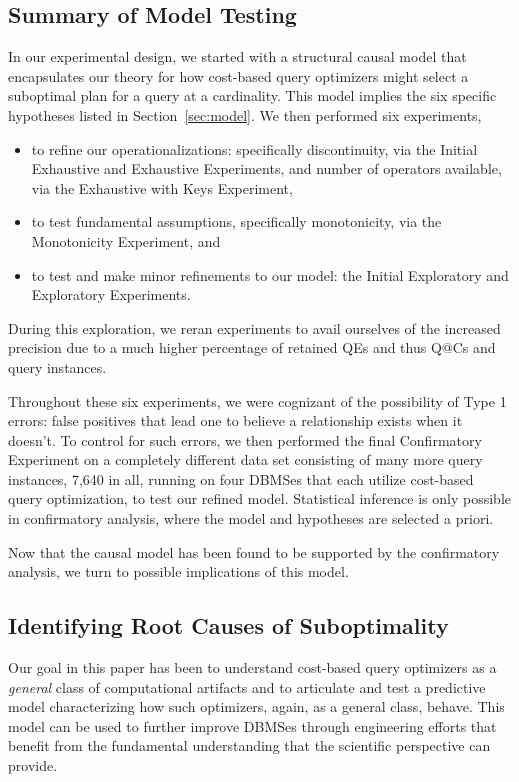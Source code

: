 \documentclass[prodmode,acmtods]{acmsmall}
\begin{document}
\subsection{Summary of Model Testing}
In our experimental design, we started with a structural causal model that
encapsulates our theory for how cost-based query optimizers might select a
suboptimal plan for a query at a cardinality. This model implies the six
specific hypotheses listed in Section~\ref{sec:model}. We then performed
six experiments,
\begin{itemize}
\item to refine our operationalizations: specifically discontinuity,
via the Initial \hbox{Exhaustive} and Exhaustive \hbox{Experiments}, and number of operators available, via the
Exhaustive with Keys \hbox{Experiment},
\item to test fundamental assumptions, specifically
monotonicity, via the Monotonicity \hbox{Experiment}, and
\item to test and make minor
refinements to our model: the Initial Exploratory and \hbox{Exploratory}
Experiments.
\end{itemize}
During this exploration,  we reran
\hbox{experiments} to avail ourselves of the increased precision due to a much
higher percentage of retained QEs and thus Q@Cs and query instances.

Throughout these six experiments, we were cognizant of the
possibility of Type 1 errors: false positives that lead one to believe a
relationship exists when it doesn't.
To control for such errors, we then performed the final Confirmatory 
Experiment on a completely different data set consisting of many more 
query instances, 7,640 in all, running on four \hbox{DBMSes} that each
utilize cost-based query optimization, to test
our refined model. Statistical inference is only possible in confirmatory
analysis, where the model and hypotheses are selected a priori.

Now that the causal model has been found to be supported by the confirmatory
\hbox{analysis}, we turn to possible implications of this model.

\subsection{Identifying Root Causes of Suboptimality}\label{sec:root}

Our goal in this paper has been to understand cost-based query optimizers
as a {\em general} class of computational artifacts and to articulate and test
a predictive model \hbox{characterizing} how such optimizers,
again, as a general class, behave.  This model can be used to further
improve \hbox{DBMSes} through engineering \hbox{efforts} that benefit from the fundamental
understanding that the scientific perspective can provide.
\end{document}

